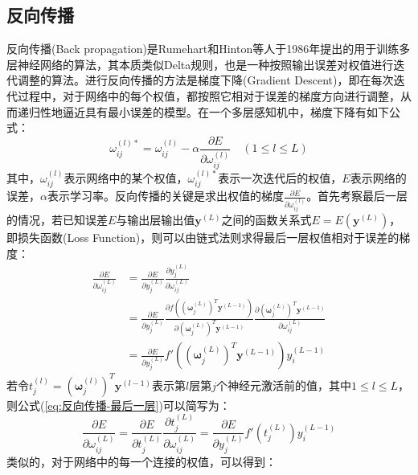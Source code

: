 \documentclass[a4paper]{ctexart}
\begin{document}
\begin{spacing}{1.3}
	\section{反向传播}
	反向传播(Back propagation)是Rumehart和Hinton等人于1986年提出的用于训练多层神经网络的算法\cite{RN127}，其本质类似Delta规则，也是一种按照输出误差对权值进行迭代调整的算法。进行反向传播的方法是梯度下降(Gradient Descent)，即在每次迭代过程中，对于网络中的每个权值，都按照它相对于误差的梯度方向进行调整，从而递归性地逼近具有最小误差的模型。在一个多层感知机中，梯度下降有如下公式：
	\begin{equation}\label{eq:权值更新公式}
		\omega_{ij}^{(l)*}=\omega_{ij}^{(l)}-\alpha\frac{\partial E}{\partial\omega_{ij}^{(l)}}
		\quad
		(1\leq l\leq L)
	\end{equation}
	其中，$\omega_{ij}^{(l)}$表示网络中的某个权值，$\omega_{ij}^{(l)*}$表示一次迭代后的权值，$E$表示网络的误差，$\alpha$表示学习率。反向传播的关键是求出权值的梯度$\frac{\partial E}{\partial\omega_{ij}^{(l)}}$。首先考察最后一层的情况，若已知误差$E$与输出层输出值$\bm{y}^{(L)}$之间的函数关系式$E=E(\bm{y}^{(L)})$，即损失函数(Loss Function)，则可以由链式法则求得最后一层权值相对于误差的梯度：
	\begin{equation}\label{eq:反向传播-最后一层}
		\begin{split}
			\frac{\partial E}{\partial\omega_{ij}^{(L)}}&=\frac{\partial E}{\partial y_j^{(L)}}\frac{\partial y_j^{(L)}}{\partial\omega_{ij}^{(L)}}\\
			&=\frac{\partial E}{\partial y_j^{(L)}}\frac{\partial f\left((\bm{\omega}_{j}^{(L)})^T\bm{y}^{(L-1)}\right)}{\partial(\bm{\omega}_{j}^{(L)})^T\bm{y}^{(L-1)}}\frac{\partial (\bm{\omega}_{j}^{(L)})^T\bm{y}^{(L-1)}}{\partial\omega_{ij}^{(L)}}\\
			&=\frac{\partial E}{\partial y_j^{(L)}}f'\left((\bm{\omega}_{j}^{(L)})^T\bm{y}^{(L-1)}\right)y_i^{(L-1)}
		\end{split}
	\end{equation}
	若令$t_j^{(l)}=(\bm{\omega}_{j}^{(l)})^T\bm{y}^{(l-1)}$表示第$l$层第$j$个神经元激活前的值，其中$1\leq l\leq L$，则公式(\ref{eq:反向传播-最后一层})可以简写为：
	\begin{equation}
		\frac{\partial E}{\partial\omega_{ij}^{(L)}}=\frac{\partial E}{\partial t_j^{(L)}}\frac{\partial t_j^{(L)}}{\partial\omega_{ij}^{(L)}}=\frac{\partial E}{\partial y_j^{(L)}}f'\left(t_j^{(L)}\right)y_i^{(L-1)}
	\end{equation}
	类似的，对于网络中的每一个连接的权值，可以得到：
	\begin{equation}\label{eq:每一层权值误差简化形式}

\end{equation}
\end{spacing}
\end{document}
